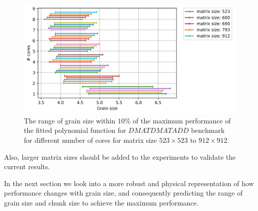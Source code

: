 \vspace{\baselineskip}	
\begin{figure}[H]
	\centering
	\includegraphics[scale=.5]{images/polyfit/fig_523-912_peak_range_all.png}
	
	\caption{The range of grain size within $10\%$ of the maximum performance of the fitted polynomial function for $DMATDMATADD$ benchmark for different number of cores for matrix size $523\times523$ to $912\times912$.}	
	\label{fig20}
\end{figure} 
\vspace{\baselineskip}	
Also, larger matrix sizes should be added to the experiments to validate the current results. 


In the next section we look into a more robust and physical representation of how performance changes with grain size, and consequently predicting the range of grain size and chunk size to achieve the maximum performance. 
 
\vspace{\baselineskip}	 